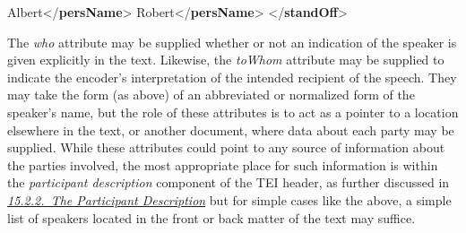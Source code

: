 \begin{shaded}
\hspace*{1em}\mbox{}\newline 
\hspace*{1em}\mbox{}\newline 
\hspace*{1em}\hspace*{1em}Albert{</\textbf{persName}>}\mbox{}\newline 
\hspace*{1em}\mbox{}\newline 
\hspace*{1em}\mbox{}\newline 
\hspace*{1em}\hspace*{1em}Robert{</\textbf{persName}>}\mbox{}\newline 
\hspace*{1em}\mbox{}\newline 
{}\mbox{}\newline 
{</\textbf{standOff}>}\end{shaded}\egroup\par \noindent  The {\itshape who} attribute may be supplied whether or not an indication of the speaker is given explicitly in the text. Likewise, the {\itshape toWhom} attribute may be supplied to indicate the encoder's interpretation of the intended recipient of the speech. They may take the form (as above) of an abbreviated or normalized form of the speaker's name, but the role of these attributes is to act as a pointer to a location elsewhere in the text, or another document, where data about each party may be supplied. While these attributes could point to any source of information about the parties involved, the most appropriate place for such information is within the \textit{participant description} component of the TEI header, as further discussed in \textit{\hyperref[CCAHPA]{15.2.2.\ The Participant Description}} but for simple cases like the above, a simple list of speakers located in the front or back matter of the text may suffice.\par
